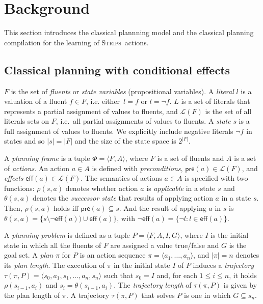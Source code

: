 \documentclass[letterpaper]{article} %
\newcommand{\tup}[1]{{\langle #1 \rangle}}
\newcommand{\pre}{\mathsf{pre}}     %
\newcommand{\eff}{\mathsf{eff}}     %
\newcommand{\strips}{\textsc{Strips}}     %
\begin{document}
\section{Background}
\label{sec:background}
This section introduces the classical plannning model and the classical planning compilation for the learning of \strips\ actions.

\subsection{Classical planning with conditional effects}
$F$ is the set of {\em fluents} or {\em state variables} (propositional variables). A {\em literal} $l$ is a valuation of a fluent $f\in F$, i.e. either~$l=f$ or $l=\neg f$. $L$ is a set of literals that represents a partial assignment of values to fluents, and $\mathcal{L}(F)$ is the set of all literals sets on $F$, i.e.~all partial assignments of values to fluents. A {\em state} $s$ is a full assignment of values to fluents. We explicitly include negative literals $\neg f$ in states and so $|s|=|F|$ and the size of the state space is $2^{|F|}$.


A {\em planning frame} is a tuple $\Phi=\tup{F,A}$, where $F$ is a set of fluents and $A$ is a set of \emph{actions}. An action $a\in A$ is defined with {\em preconditions}, $\pre(a)\in\mathcal{L}(F)$,  and {\em effects} $\eff(a)\in\mathcal{L}(F)$. The semantics of actions $a\in A$ is specified with two functions: $\rho(s,a)$ denotes whether action $a$ is {\em applicable} in a state $s$ and $\theta(s,a)$ denotes the {\em successor state} that results of applying action $a$ in a state $s$. Then, $\rho(s,a)$ holds iff $\pre(a)\subseteq s$. And the result of applying $a$ in $s$ is $\theta(s,a)=\{s\setminus\neg\eff(a))\cup\eff(a)\}$, with $\neg\eff(a) = \{\neg l : l \in \eff(a)\}$.

A {\em planning problem} is defined as a tuple $P=\tup{F,A,I,G}$, where $I$ is the initial state in which all the fluents of $F$ are assigned a value true/false and $G$ is the goal set. A {\em plan} $\pi$ for $P$ is an action sequence $\pi=\tup{a_1, \ldots, a_n}$, and $|\pi|=n$ denotes its {\em plan length}. The execution of $\pi$ in the initial state $I$ of $P$ induces a {\em trajectory} $\tau(\pi,P)=\tup{s_0, a_1, s_1, \ldots, a_n, s_n}$ such that $s_0=I$ and, for each {\small $1\leq i\leq n$}, it holds $\rho(s_{i-1},a_i)$ and $s_i=\theta(s_{i-1},a_i)$. The {\em trajectory length} of $\tau(\pi,P)$ is given by the plan length of $\pi$. A trajectory $\tau(\pi,P)$ that solves $P$ is one in which $G \subseteq s_n$.
\end{document}
